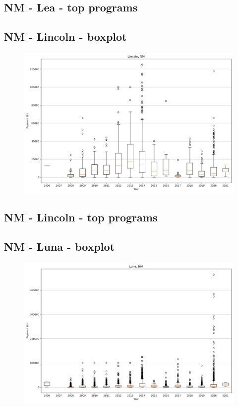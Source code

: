 \subsection*{NM - Lea - top programs}

\newpage
\subsection*{NM - Lincoln - boxplot}
\begin{figure}[h]
\centering
\includegraphics[width=7in]{../output/boxplots/counties/Lincoln-NM_boxplot.png}
\end{figure}


\subsection*{NM - Lincoln - top programs}

\newpage
\subsection*{NM - Luna - boxplot}
\begin{figure}[h]
\centering
\includegraphics[width=7in]{../output/boxplots/counties/Luna-NM_boxplot.png}
\end{figure}


